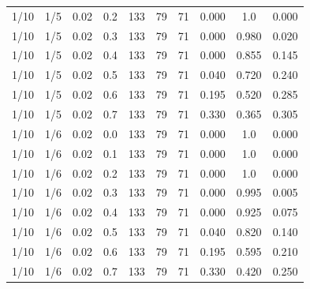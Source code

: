 \documentclass[specialist, substylefile = spbu.rtx,
			   subf, href, 12pt]{disser}
\begin{document}
\begin{table}[!hhh]
\begin{tabular}{cccccccccc}
		1/10 &     1/5 &        0.02 &     0.2 & 133 & 79 & 71 & 0.000 & 1.0 & 0.000 \\
		1/10 &     1/5 &        0.02 &     0.3 & 133 & 79 & 71 & 0.000 & 0.980 & 0.020 \\
		1/10 &     1/5 &        0.02 &     0.4 & 133 & 79 & 71 & 0.000 & 0.855 & 0.145 \\
		1/10 &     1/5 &        0.02 &     0.5 & 133 & 79 & 71 & 0.040 & 0.720 & 0.240 \\
		1/10 &     1/5 &        0.02 &     0.6 & 133 & 79 & 71 & 0.195 & 0.520 & 0.285 \\
		1/10 &     1/5 &        0.02 &     0.7 & 133 & 79 & 71 & 0.330 & 0.365 & 0.305 \\
		\hline
		1/10 &     1/6 &        0.02 &     0.0 & 133 & 79 & 71 & 0.000 & 1.0 & 0.000 \\
		1/10 &     1/6 &        0.02 &     0.1 & 133 & 79 & 71 & 0.000 & 1.0 & 0.000 \\
		1/10 &     1/6 &        0.02 &     0.2 & 133 & 79 & 71 & 0.000 & 1.0 & 0.000 \\
		1/10 &     1/6 &        0.02 &     0.3 & 133 & 79 & 71 & 0.000 & 0.995 & 0.005 \\
		1/10 &     1/6 &        0.02 &     0.4 & 133 & 79 & 71 & 0.000 & 0.925 & 0.075 \\
		1/10 &     1/6 &        0.02 &     0.5 & 133 & 79 & 71 & 0.040 & 0.820 & 0.140 \\
		1/10 &     1/6 &        0.02 &     0.6 & 133 & 79 & 71 & 0.195 & 0.595 & 0.210 \\
		1/10 &     1/6 &        0.02 &     0.7 & 133 & 79 & 71 & 0.330 & 0.420 & 0.250 \\
		\bottomrule
	\end{tabular}
	\label{tab:simplified_system_results_k=15_1}
\end{table}
\end{document}
